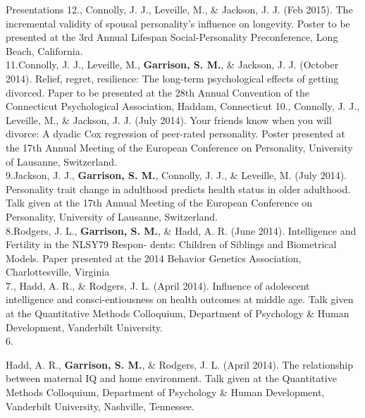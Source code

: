 \documentclass {resume}
\newcommand{\meb}{{\bf Garrison, S. M.}\xspace}
\begin{document}
\begin{rSection}{\textrm{Presentations}}
12.\hspace* {1mm}\meb, Connolly, J. J., Leveille, M., \& Jackson, J. J. (Feb 2015). The incremental validity of \hspace* {6 mm}spousal personality's influence on longevity. Poster to be presented at the 3rd Annual Lifespan Social-Personality \hspace* {6 mm}Preconference, Long Beach, California.\smallskip\\
11.\hspace* {1mm}Connolly, J. J., Leveille, M., \meb, \& Jackson, J. J. (October 2014). Relief,  regret,  resilience: The  \hspace* {6 mm}long-term  psychological  effects  of  getting divorced. Paper to be presented at the 28th Annual Convention of the \hspace* {6 mm}Connecticut Psychological Association, Haddam, Connecticut\newpage
10.\hspace* {1mm}\meb, Connolly, J. J., Leveille, M., \& Jackson, J. J. (July 2014). Your friends know when you will \hspace* {6 mm}divorce: A dyadic Cox regression of peer-rated personality. Poster presented at the 17th Annual Meeting of the \hspace* {6 mm}European Conference on Personality, University of Lausanne, Switzerland.
\smallskip\\
9.\hspace* {2.5mm}Jackson, J. J., \meb, Connolly, J. J., \& Leveille, M. (July 2014). Personality trait change in \hspace* {6 mm}adulthood predicts health status in older adulthood. Talk given at the 17th Annual Meeting of the European \hspace* {6 mm}Conference on Personality, University of Lausanne, Switzerland.
\smallskip\\
8.\hspace* {2.5mm}Rodgers, J. L., \meb, \& Hadd, A. R. (June 2014). Intelligence and Fertility in the NLSY79 Respon-
\hspace* {6 mm}dents: Children of Siblings and Biometrical Models. Paper presented at the 2014 Behavior Genetics Association, \hspace* {6 mm}Charlottesville, Virginia 
\smallskip\\
7.\hspace* {2.5 mm}\meb, Hadd, A. R., \& Rodgers, J. L. (April 2014). Influence of adolescent intelligence and consci-\hspace* {6 mm}entiousness on health outcomes at middle age. Talk given at the Quantitative Methods Colloquium, Department \hspace* {6 mm}of Psychology \& Human Development, Vanderbilt University. \smallskip\\
6.\hspace* {2.5 mm}\begin{samepage}Hadd, A. R., \meb, \& Rodgers, J. L. (April 2014). The relationship between maternal IQ and \hspace* {6 mm}home environment. Talk given at the Quantitative Methods Colloquium, Department of Psychology \& Human \hspace* {6 mm}Development, Vanderbilt University, Nashville, Tennessee. \smallskip\\\end{samepage}%

\end{rSection}
\end{document}
